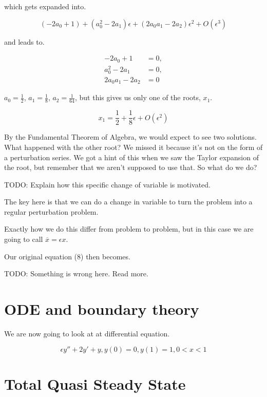 \documentclass[12pt]{article}
\begin{document}
which gets expanded into.

\begin{equation}
(- 2 a_0 + 1) + (a_0^2 - 2 a_1) \epsilon + (2 a_0 a_1 -2 a_2) \epsilon^2 +
O(\epsilon^3)
\end{equation}

and leads to.

\begin{align*}
- 2 a_0 + 1 &= 0, \\
a_0^2 - 2 a_1 &= 0, \\
2 a_0 a_1 -2 a_2 &= 0
\end{align*}

$a_0 = \frac{1}{2}$, $a_1=\frac{1}{8}$, $a_2= \frac{1}{64}$, but this gives us
only one of the roots, $x_1$.

\begin{equation}
x_1 = \frac{1}{2} + \frac{1}{8} \epsilon + O(\epsilon^2)
\end{equation}

By the Fundamental Theorem of Algebra, we would expect to see two solutions.
What happened with the other root? We missed it because it's not on the form of
a perturbation series. We got a hint of this when we saw the Taylor expansion of
the root, but remember that we aren't supposed to use that. So what do we do?
  
TODO: Explain how this specific change of variable is motivated.

The key here is that we can do a change in variable to turn the problem into a
regular perturbation problem.

Exactly how we do this differ from problem to
problem, but in this case we are going to call $\overline{x} = \epsilon x$.

Our original equation (8) then becomes.

TODO: Something is wrong here. Read more.

\section{ODE and boundary theory}

We are now going to look at at differential equation.

\begin{equation}
\epsilon y'' + 2 y' + y, y(0)=0, y(1)=1, 0 <x < 1
\end{equation}

\section{Total Quasi Steady State}
\end{document}
